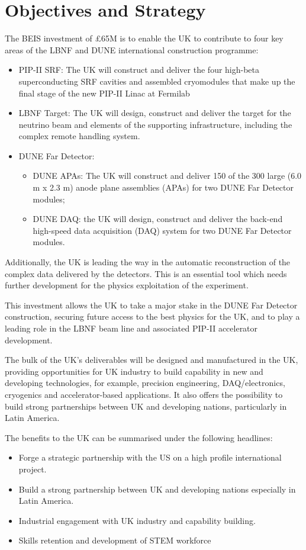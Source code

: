\section{Objectives and Strategy}

The BEIS investment of £65M is to enable the UK to contribute to four key areas of the LBNF and DUNE international construction programme:
\begin{itemize}
    \item PIP-II SRF: The UK will construct and deliver the four high-beta superconducting SRF cavities and assembled cryomodules that make up the final stage of the new PIP-II Linac at Fermilab
    \item LBNF Target: The UK will design, construct and deliver the target for the neutrino beam and elements of the supporting infrastructure, including the complex remote handling system.
    \item DUNE Far Detector:
    \begin{itemize}
        \item DUNE APAs: The UK will construct and deliver 150 of the 300 large (6.0 m x 2.3 m) anode plane assemblies (APAs) for two DUNE Far Detector modules;
        \item DUNE DAQ: the UK will design, construct and deliver the back-end high-speed data acquisition (DAQ) system for two DUNE Far Detector modules.
    \end{itemize}
\end{itemize}
Additionally, the UK is leading the way in the automatic reconstruction of the complex data delivered by the detectors. This is an essential tool which needs further development for the physics exploitation of the experiment.

This investment allows the UK to take a major stake in the DUNE Far Detector construction, securing future access to the best physics for the UK, and to play a leading role in the LBNF beam line and associated PIP-II accelerator development.

The bulk of the UK’s deliverables will be designed and manufactured in the UK, providing opportunities for UK industry to build capability in new and developing technologies, for example, precision engineering, DAQ/electronics, cryogenics and accelerator-based applications. It also offers the possibility to build strong partnerships between UK and developing nations, particularly in Latin America.

The benefits to the UK can be summarised under the following headlines:
\begin{itemize}
    \item Forge a strategic partnership with the US on a high profile international project.
    \item Build a strong partnership between UK and developing nations especially in Latin America.
    \item Industrial engagement with UK industry and capability building.
    \item Skills retention and development of STEM workforce
\end{itemize}

